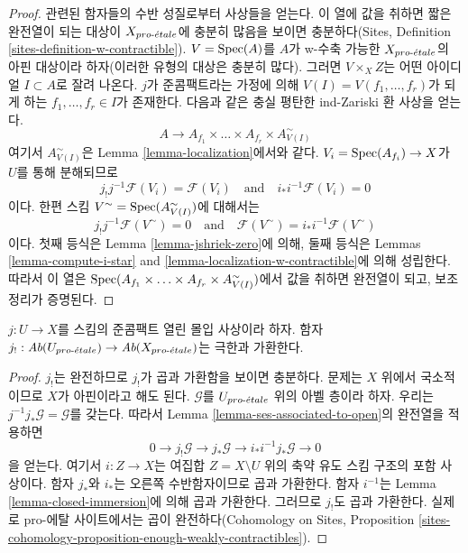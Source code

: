 \begin{proof}
관련된 함자들의 수반 성질로부터 사상들을 얻는다. 이 열에 값을
취하면 짧은 완전열이 되는 대상이 $X_{pro\text{-}\acute{e}tale}$에 충분히 많음을
보이면 충분하다(Sites, Definition
\ref{sites-definition-w-contractible}). $V = \mathop{\mathrm{Spec}}(A)$를 $A$가
w-수축 가능한 $X_{pro\text{-}\acute{e}tale}$의 아핀 대상이라 하자(이러한 유형의
대상은 충분히 많다). 그러면 $V \times_X Z$는 어떤 아이디얼
$I \subset A$로 잘려 나온다. $j$가 준콤팩트라는 가정에 의해
$V(I) = V(f_1, \ldots, f_r)$가 되게 하는
$f_1, \ldots, f_r \in I$가 존재한다. 다음과 같은 충실 평탄한
ind-Zariski 환 사상을 얻는다.
$$
A \longrightarrow A_{f_1} \times \ldots \times A_{f_r} \times
A_{V(I)}^\sim
$$
여기서 $A_{V(I)}^\sim$은 Lemma \ref{lemma-localization}에서와 같다.
$V_i = \mathop{\mathrm{Spec}}(A_{f_i}) \to X$가 $U$를 통해 분해되므로
$$
j_!j^{-1}\mathcal{F}(V_i) = \mathcal{F}(V_i)
\quad\text{and}\quad
i_*i^{-1}\mathcal{F}(V_i) = 0
$$
이다. 한편 스킴 $V^\sim = \mathop{\mathrm{Spec}}(A_{V(I)}^\sim)$에 대해서는
$$
j_!j^{-1}\mathcal{F}(V^\sim) = 0
\quad\text{and}\quad
\mathcal{F}(V^\sim) = i_*i^{-1}\mathcal{F}(V^\sim)
$$
이다. 첫째 등식은 Lemma \ref{lemma-jshriek-zero}에 의해, 둘째 등식은
Lemmas \ref{lemma-compute-i-star} and
\ref{lemma-localization-w-contractible}에 의해 성립한다. 따라서 이 열은
$\mathop{\mathrm{Spec}}(A_{f_1} \times \ldots \times A_{f_r} \times A_{V(I)}^\sim)$에서
값을 취하면 완전열이 되고, 보조정리가 증명된다.
\end{proof}

\begin{lemma}
\label{lemma-j-shriek-limits}
$j : U \to X$를 스킴의 준콤팩트 열린 몰입 사상이라 하자. 함자
$j_! : \textit{Ab}(U_{pro\text{-}\acute{e}tale}) \to \textit{Ab}(X_{pro\text{-}\acute{e}tale})$는
극한과 가환한다.
\end{lemma}

\begin{proof}
$j_!$는 완전하므로 $j_!$가 곱과 가환함을 보이면 충분하다. 문제는
$X$ 위에서 국소적이므로 $X$가 아핀이라고 해도 된다.
$\mathcal{G}$를 $U_{pro\text{-}\acute{e}tale}$ 위의 아벨 층이라 하자. 우리는
$j^{-1}j_*\mathcal{G} = \mathcal{G}$를 갖는다. 따라서 Lemma
\ref{lemma-ses-associated-to-open}의 완전열을 적용하면
$$
0 \to j_!\mathcal{G} \to j_*\mathcal{G} \to i_*i^{-1}j_*\mathcal{G} \to 0
$$
을 얻는다. 여기서 $i : Z \to X$는 여집합
$Z = X \setminus U$ 위의 축약 유도 스킴 구조의 포함 사상이다.
함자 $j_*$와 $i_*$는 오른쪽 수반함자이므로 곱과 가환한다. 함자
$i^{-1}$는 Lemma \ref{lemma-closed-immersion}에 의해 곱과 가환한다.
그러므로 $j_!$도 곱과 가환한다. 실제로 pro-에탈 사이트에서는 곱이
완전하다(Cohomology on Sites, Proposition
\ref{sites-cohomology-proposition-enough-weakly-contractibles}).
\end{proof}






